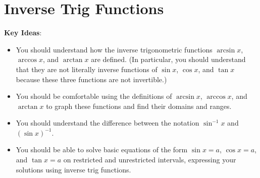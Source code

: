\documentclass[main]{subfiles}
\begin{document}
\ifSubfilesClassLoaded{%
  \chaptermark{\chapterthree}
}{}

\section{Inverse Trig Functions} \label{ws3-3}

\begin{problemonly}
    \begin{framed}

\textbf{Key Ideas}:

\begin{itemize}[topsep=0pt,partopsep=0pt,parsep=8pt,itemsep=0pt]

\item You should understand how the inverse trigonometric functions
  $\arcsin x$, $\arccos x$, and $\arctan x$ are defined.  (In particular,
  you should understand that they are not literally inverse functions of
  $\sin x$, $\cos x$, and $\tan x$ because these three functions are not
  invertible.)

\item You should be comfortable using the definitions of $\arcsin x$,
  $\arccos x$, and $\arctan x$ to graph these functions and find their
  domains and ranges.

\item You should understand the difference between the notation $\sin^{-1}
  x$ and $(\sin x)^{-1}$.

\item You should be able to solve basic equations of the form $\sin x =
  a$, $\cos x = a$, and $\tan x = a$ on restricted and unrestricted
  intervals, expressing your solutions using inverse trig functions.

\end{itemize}
\end{framed}
\end{problemonly}
\end{document}
